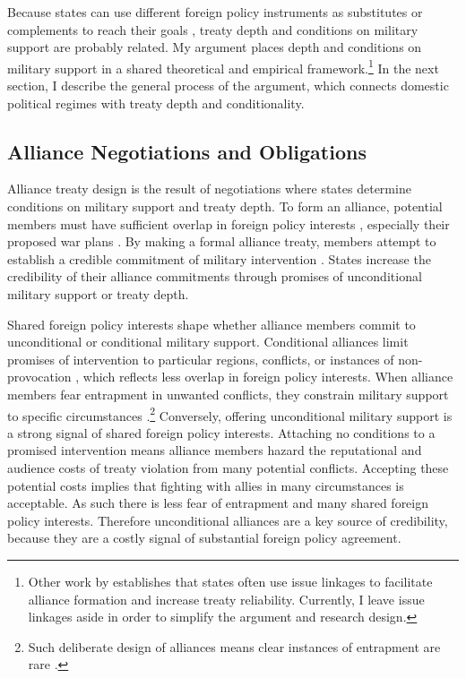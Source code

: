 \documentclass[12pt]{article}
\begin{document}
Because states can use different foreign policy instruments as substitutes or complements to reach their goals \citep{Starr2000, MorganPalmer2000}, treaty depth and conditions on military support are probably related. 
My argument places depth and conditions on military support in a shared theoretical and empirical framework.\footnote{Other work by \citet{Poast2012, Poast2013} establishes that states often use issue linkages to facilitate alliance formation and increase treaty reliability. Currently, I leave issue linkages aside in order to simplify the argument and research design.}
In the next section, I describe the general process of the argument, which connects domestic political regimes with treaty depth and conditionality. 


\subsection{Alliance Negotiations and Obligations}


Alliance treaty design is the result of negotiations where states determine conditions on military support and treaty depth.
To form an alliance, potential members must have sufficient overlap in foreign policy interests \citep{Morrow1991, Smith1995, FordhamPoast2014}, especially their proposed war plans \citep{Poast2019a}. 
By making a formal alliance treaty, members attempt to establish a credible commitment of military intervention \citep{Morrow2000}. 
States increase the credibility of their alliance commitments through promises of unconditional military support or treaty depth.  

 
Shared foreign policy interests shape whether alliance members commit to unconditional or conditional military support.
Conditional alliances limit promises of intervention to particular regions, conflicts, or instances of non-provocation \citep{Leedsetal2000}, which reflects less overlap in foreign policy interests. 
When alliance members fear entrapment in unwanted conflicts, they constrain military support to specific circumstances \citep{Kim2011, Benson2012}.\footnote{Such deliberate design of alliances means clear instances of entrapment are rare \citep{Kim2011, Beckley2015}.} 
Conversely, offering unconditional military support is a strong signal of shared foreign policy interests. 
Attaching no conditions to a promised intervention means alliance members hazard the reputational \citep{Gibler2008, Crescenzietal2012} and audience \citep{Fearon1997} costs of treaty violation from many potential conflicts. 
Accepting these potential costs implies that fighting with allies in many circumstances is acceptable.
As such there is less fear of entrapment and many shared foreign policy interests. 
Therefore unconditional alliances are a key source of credibility, because they are a costly signal of substantial foreign policy agreement. 
\end{document}
